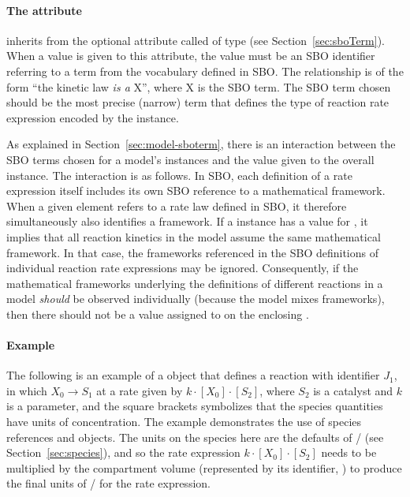 \paragraph{The  attribute}

\KineticLaw inherits from \SBase the optional attribute
called  of type  (see
Section~\ref{sec:sboTerm}).  When a value is given to this
attribute, the value must be an SBO identifier referring
to a term from the \sboratelaw vocabulary defined in SBO.  The
relationship is of the form ``the kinetic law \emph{is a} X'',
where X is the SBO term.  The SBO term chosen should be the most
precise (narrow) term that defines the type of reaction
  rate expression encoded by the \KineticLaw instance.

As explained in Section~\ref{sec:model-sboterm}, there is an
interaction between the SBO terms chosen for a model's \KineticLaw
instances and the  value given to the overall
\Model instance.  The interaction is as follows.  In
SBO, each definition of a rate expression itself includes its own
SBO reference to a mathematical framework.  When a given
\KineticLaw element refers to a rate law defined in SBO, it
therefore simultaneously also identifies a framework.  If a \Model
instance has a value for , it implies that all
reaction kinetics in the model assume the same mathematical
framework.  In that case, the frameworks referenced in the SBO
definitions of individual reaction rate expressions may be
ignored.  Consequently, if the mathematical frameworks underlying
the definitions of different reactions in a model \emph{should} be
observed individually (\eg because the model mixes frameworks),
then there should not be a value assigned to  on
the enclosing \Model.


\paragraph{Example}

The following is an example of a \Reaction object that defines
a reaction with identifier $J_1$, in which $X_0 \rightarrow S_1$
at a rate given by $k \cdot [X_0] \cdot [S_2]$, where $S_2$ is a catalyst
and $k$ is a parameter, and the square brackets symbolizes that
the species quantities have units of concentration.  The example
demonstrates the use of species references and \KineticLaw
objects.  The units on the species here are the defaults of
/ (see
Section~\ref{sec:species}), and so the rate expression $k \cdot [X_0]
 \cdot [S_2]$ needs to be multiplied by the compartment volume
(represented by its identifier, ) to produce the final
units of / for the rate
expression.

